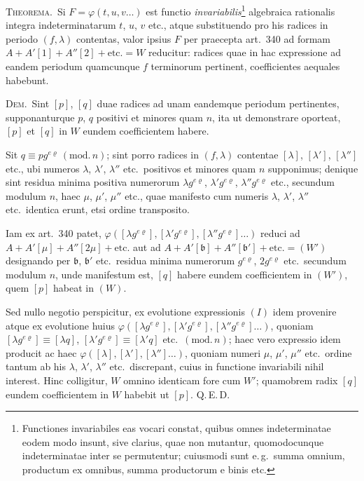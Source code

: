 \documentclass[12pt,a4paper]{article}
\theoremstyle{plain}
\theoremstyle{definition}
\theoremstyle{remark}
\begin{document}
\textsc{Theorema.}\ Si $F=\varphi(t,u,v\ldots)$ est functio \emph{invariabilis}\footnote{Functiones invariabiles eas vocari constat, quibus omnes indeterminatae eodem modo insunt, sive clarius, quae non mutantur, quomodocunque indeterminatae inter se permutentur; cuiusmodi sunt e.\,g.\ summa omnium, productum ex omnibus, summa productorum e binis etc.} algebraica rationalis integra indeterminatarum $t$, $u$, $v$ etc., atque substituendo pro his radices in periodo $(f,\lambda)$ contentas, valor ipsius $F$ per praecepta art.\ 340 ad formam $A+A'[1]+A''[2]+\text{etc.}=W$ reducitur: radices quae in hac expressione ad eandem periodum quamcunque $f$ terminorum pertinent, coefficientes aequales habebunt.

\textsc{Dem.}\ Sint $[p]$, $[q]$ duae radices ad unam eandemque periodum pertinentes, supponanturque $p$, $q$ positivi et minores quam $n$, ita ut demonstrare oporteat, $[p]$ et $[q]$ in $W$ eundem coefficientem habere.

Sit $q\equiv pg^{e\varrho}\,(\mathrm{mod.}\,n)$; sint porro radices in $(f,\lambda)$ contentae $[\lambda]$, $[\lambda']$, $[\lambda'']$ etc., ubi numeros $\lambda$, $\lambda'$, $\lambda''$ etc.\ positivos et minores quam $n$ supponimus; denique sint residua minima positiva numerorum $\lambda g^{e\varrho}$, $\lambda' g^{e\varrho}$, $\lambda'' g^{e\varrho}$ etc., secundum modulum $n$, haec $\mu$, $\mu'$, $\mu''$ etc., quae manifesto cum numeris $\lambda$, $\lambda'$, $\lambda''$ etc.\ identica erunt, etsi ordine transposito.

Iam ex art.\ 340 patet, $\varphi([\lambda g^{e\varrho}], [\lambda' g^{e\varrho}], [\lambda'' g^{e\varrho}]\ldots)$ reduci ad $A+A'[\mu]+A''[2\mu]+\text{etc.}$ aut ad $A+A'[\mathfrak{b}]+A''[\mathfrak{b}']+\text{etc.}=(W')$ designando per $\mathfrak{b}$, $\mathfrak{b}'$ etc.\ residua minima numerorum $g^{e\varrho}$, $2g^{e\varrho}$ etc.\ secundum modulum $n$, unde manifestum est, $[q]$ habere eundem coefficientem in $(W')$, quem $[p]$ habeat in $(W)$.

Sed nullo negotio perspicitur, ex evolutione expressionis $(I)$ idem provenire atque ex evolutione huius $\varphi([\lambda g^{e\varrho}], [\lambda' g^{e\varrho}], [\lambda'' g^{e\varrho}]\ldots)$, quoniam $[\lambda g^{e\varrho}]\equiv[\lambda q]$, $[\lambda' g^{e\varrho}]\equiv[\lambda' q]$ etc.\ $(\mathrm{mod.}\,n)$; haec vero expressio idem producit ac haec $\varphi([\lambda], [\lambda'], [\lambda'']\ldots)$, quoniam numeri $\mu$, $\mu'$, $\mu''$ etc.\ ordine tantum ab his $\lambda$, $\lambda'$, $\lambda''$ etc.\ discrepant, cuius in functione invariabili nihil interest. Hinc colligitur, $W$ omnino identicam fore cum $W'$; quamobrem radix $[q]$ eundem coefficientem in $W$ habebit ut $[p]$. Q.\,E.\,D.
\end{document}
